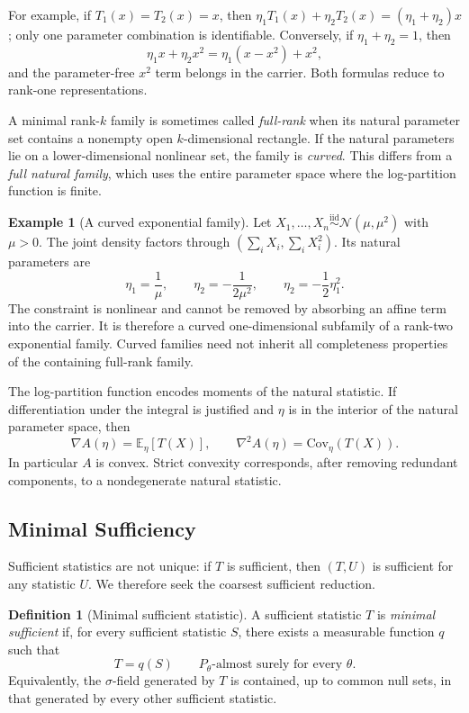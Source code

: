 \documentclass[12pt,oneside]{book}
\numberwithin{equation}{section}
\theoremstyle{definition}
\newtheorem{definition}{Definition}[section]
\newtheorem{example}{Example}[section]
\theoremstyle{plain}
\theoremstyle{remark}
\newcommand{\E}{\mathbb{E}}
\newcommand{\Cov}{\mathrm{Cov}}
\newcommand{\iid}{\overset{\text{iid}}{\sim}}
\newcommand{\grad}{\nabla}
\newcommand{\Hess}{\nabla^2}
\newcommand{\Normal}{\mathcal{N}}
\begin{document}
For example, if $T_1(x)=T_2(x)=x$, then
$\eta_1T_1(x)+\eta_2T_2(x)=(\eta_1+\eta_2)x$; only one parameter combination
is identifiable. Conversely, if $\eta_1+\eta_2=1$, then
\[
 \eta_1x+\eta_2x^2=\eta_1(x-x^2)+x^2,
\]
and the parameter-free $x^2$ term belongs in the carrier. Both formulas
reduce to rank-one representations.

A minimal rank-$k$ family is sometimes called \emph{full-rank} when its
natural parameter set contains a nonempty open $k$-dimensional rectangle. If
the natural parameters lie on a lower-dimensional nonlinear set, the family
is \emph{curved}. This differs from a \emph{full natural family}, which uses
the entire parameter space where the log-partition function is finite.

\begin{example}[A curved exponential family]
Let $X_1,\ldots,X_n\iid\Normal(\mu,\mu^2)$ with $\mu>0$.  The joint density
factors through $(\sum_iX_i,\sum_iX_i^2)$. Its natural parameters are
\[
 \eta_1=\frac1\mu,
 \qquad \eta_2=-\frac1{2\mu^2},
 \qquad \eta_2=-\frac12\eta_1^2.
\]
The constraint is nonlinear and cannot be removed by absorbing an affine
term into the carrier. It is therefore a curved one-dimensional subfamily of
a rank-two exponential family. Curved families need not inherit all
completeness properties of the containing full-rank family.
\end{example}

The log-partition function encodes moments of the natural statistic.  If
differentiation under the integral is justified and $\eta$ is in the interior
of the natural parameter space, then
\begin{equation}
    \grad A(\eta)=\E_\eta[T(X)],
    \qquad
    \Hess A(\eta)=\Cov_\eta(T(X)).
    \label{eq:log-partition-moments}
\end{equation}
In particular $A$ is convex.  Strict convexity corresponds, after removing
redundant components, to a nondegenerate natural statistic.


\subsection{Minimal Sufficiency}

Sufficient statistics are not unique: if $T$ is sufficient, then
$(T,U)$ is sufficient for any statistic $U$.  We therefore seek the coarsest
sufficient reduction.

\begin{definition}[Minimal sufficient statistic]
A sufficient statistic $T$ is \emph{minimal sufficient} if, for every
sufficient statistic $S$, there exists a measurable function $q$ such that
\[
    T=q(S)\qquad P_\theta\text{-almost surely for every }\theta.
\]
Equivalently, the $\sigma$-field generated by $T$ is contained, up to common
null sets, in that generated by every other sufficient statistic.
\end{definition}
\end{document}
